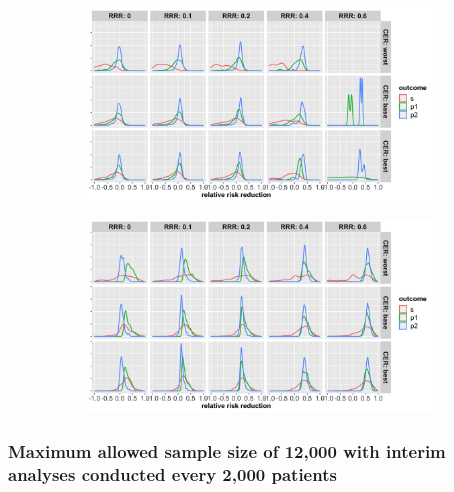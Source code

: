 \documentclass[]{article}
\begin{document}
\begin{figure}
\centering
  \caption{Distribution of relative risk reduction estimates after stopping early for (a) futility; (b) superiority.
  Results are presented for the three control event rates by rows, relative risk reductions (by columns) and the
  three outcomes (legend).}
  \begin{subfigure}{0.8\textwidth}
    \centering
    \caption{}
    \includegraphics{../p1_plots/batch_size_nb_1000/RRRhat_fut_p1.png}
  \end{subfigure}
  \bigbreak
  \begin{subfigure}{0.8\textwidth}
    \centering
    \caption{}
    \includegraphics{../p1_plots/batch_size_nb_1000/RRRhat_sup_p1.png}
  \end{subfigure}
\end{figure}

\clearpage

\hypertarget{maximum-allowed-sample-size-of-12000-with-interim-analyses-conducted-every-2000-patients}{%
\subsubsection{Maximum allowed sample size of 12,000 with interim
analyses conducted every 2,000
patients}\label{maximum-allowed-sample-size-of-12000-with-interim-analyses-conducted-every-2000-patients}}
\end{document}

